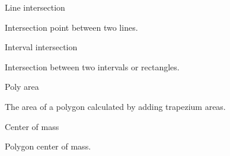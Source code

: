\begin{algorithm}{Line intersection}

Intersection point between two lines.
\end{algorithm}

\begin{algorithm}{Interval intersection}

Intersection between two intervals or rectangles.
\end{algorithm}

\begin{algorithm}{Poly area}

The area of a polygon calculated by adding trapezium areas.
\end{algorithm}

\begin{algorithm}{Center of mass}

Polygon center of mass.
\end{algorithm}
